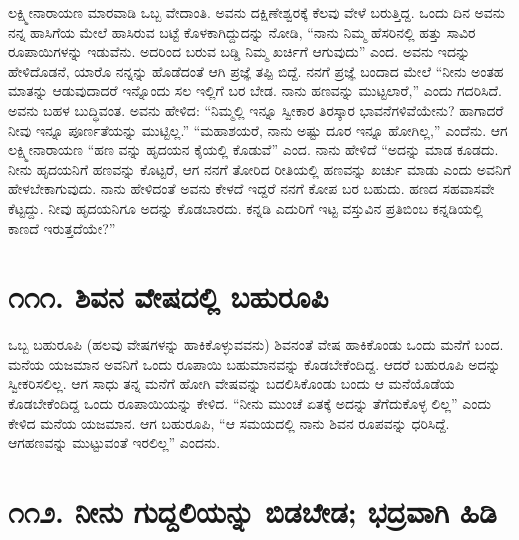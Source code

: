 ಲಕ್ಷ್ಮೀನಾರಾಯಣ ಮಾರವಾಡಿ ಒಬ್ಬ ವೇದಾಂತಿ. ಅವನು ದಕ್ಷಿಣೇಶ್ವರಕ್ಕೆ ಕೆಲವು ವೇಳೆ ಬರುತ್ತಿದ್ದ. ಒಂದು ದಿನ ಅವನು ನನ್ನ ಹಾಸಿಗೆಯ ಮೇಲೆ ಹಾಸಿರುವ ಬಟ್ಟೆ ಕೊಳಕಾಗಿದ್ದುದನ್ನು ನೋಡಿ, “ನಾನು ನಿಮ್ಮ ಹೆಸರಿನಲ್ಲಿ ಹತ್ತು ಸಾವಿರ ರೂಪಾಯಿಗಳನ್ನು ಇಡುವೆನು. ಅದರಿಂದ ಬರುವ ಬಡ್ಡಿ ನಿಮ್ಮ ಖರ್ಚಿಗೆ ಆಗುವುದು” ಎಂದ. ಅವನು ಇದನ್ನು ಹೇಳಿದೊಡನೆ, ಯಾರೊ ನನ್ನನ್ನು ಹೊಡೆದಂತೆ ಆಗಿ ಪ್ರಜ್ಞೆ ತಪ್ಪಿ ಬಿದ್ದೆ. ನನಗೆ ಪ್ರಜ್ಞೆ ಬಂದಾದ ಮೇಲೆ “ನೀನು ಅಂತಹ ಮಾತನ್ನು ಆಡುವುದಾದರೆ ಇನ್ನೊಂದು ಸಲ ಇಲ್ಲಿಗೆ ಬರ ಬೇಡ. ನಾನು ಹಣವನ್ನು ಮುಟ್ಟಲಾರೆ,” ಎಂದು ಗದರಿಸಿದೆ. ಅವನು ಬಹಳ ಬುದ್ಧಿವಂತ. ಅವನು ಹೇಳಿದ: “ನಿಮ್ಮಲ್ಲಿ ಇನ್ನೂ ಸ್ವೀಕಾರ ತಿರಸ್ಕಾರ ಭಾವನೆಗಳಿವೆಯೇನು? ಹಾಗಾದರೆ ನೀವು ಇನ್ನೂ ಪೂರ್ಣತೆಯನ್ನು ಮುಟ್ಟಿಲ್ಲ.” “ಮಹಾಶಯರೆ, ನಾನು ಅಷ್ಟು ದೂರ ಇನ್ನೂ ಹೋಗಿಲ್ಲ,” ಎಂದೆನು. ಆಗ ಲಕ್ಷ್ಮೀನಾರಾಯಣ “ಹಣ ವನ್ನು ಹೃದಯನ ಕೈಯಲ್ಲಿ ಕೊಡುವೆ” ಎಂದ. ನಾನು ಹೇಳಿದೆ “ಅದನ್ನು ಮಾಡ ಕೂಡದು. ನೀನು ಹೃದಯನಿಗೆ ಹಣವನ್ನು ಕೊಟ್ಟರೆ, ಆಗ ನನಗೆ ತೋರಿದ ರೀತಿಯಲ್ಲಿ ಹಣವನ್ನು ಖರ್ಚು ಮಾಡು ಎಂದು ಅವನಿಗೆ ಹೇಳಬೇಕಾಗುವುದು. ನಾನು ಹೇಳಿದಂತೆ ಅವನು ಕೇಳದೆ ಇದ್ದರೆ ನನಗೆ ಕೋಪ ಬರ ಬಹುದು. ಹಣದ ಸಹವಾಸವೇ ಕೆಟ್ಟದ್ದು. ನೀವು ಹೃದಯನಿಗೂ ಅದನ್ನು ಕೊಡಬಾರದು. ಕನ್ನಡಿ ಎದುರಿಗೆ ಇಟ್ಟ ವಸ್ತುವಿನ ಪ್ರತಿಬಿಂಬ ಕನ್ನಡಿಯಲ್ಲಿ ಕಾಣದೆ ಇರುತ್ತದೆಯೇ?”



\section{\num{೧೧೧. } ಶಿವನ ವೇಷದಲ್ಲಿ ಬಹುರೂಪಿ}

ಒಬ್ಬ ಬಹುರೂಪಿ (ಹಲವು ವೇಷಗಳನ್ನು ಹಾಕಿಕೊಳ್ಳುವವನು) ಶಿವನಂತೆ ವೇಷ ಹಾಕಿಕೊಂಡು ಒಂದು ಮನೆಗೆ ಬಂದ. ಮನೆಯ ಯಜಮಾನ ಅವನಿಗೆ ಒಂದು ರೂಪಾಯಿ ಬಹುಮಾನವನ್ನು ಕೊಡಬೇಕೆಂದಿದ್ದ. ಆದರೆ ಬಹುರೂಪಿ ಅದನ್ನು ಸ್ವೀಕರಿಸಲಿಲ್ಲ. ಆಗ ಸಾಧು ತನ್ನ ಮನೆಗೆ ಹೋಗಿ ವೇಷವನ್ನು ಬದಲಿಸಿಕೊಂಡು ಬಂದು ಆ ಮನೆಯೊಡೆಯ ಕೊಡಬೇಕೆಂದಿದ್ದ ಒಂದು ರೂಪಾಯಿಯನ್ನು ಕೇಳಿದ. “ನೀನು ಮುಂಚೆ ಏತಕ್ಕೆ ಅದನ್ನು ತೆಗೆದುಕೊಳ್ಳ ಲಿಲ್ಲ” ಎಂದು ಕೇಳಿದ ಮನೆಯ ಯಜಮಾನ. ಆಗ ಬಹುರೂಪಿ, “ಆ ಸಮಯದಲ್ಲಿ ನಾನು ಶಿವನ ರೂಪವನ್ನು ಧರಿಸಿದ್ದೆ. ಆಗಹಣವನ್ನು ಮುಟ್ಟುವಂತೆ ಇರಲಿಲ್ಲ” ಎಂದನು.


\section{\num{೧೧೨. } ನೀನು ಗುದ್ದಲಿಯನ್ನು ಬಿಡಬೇಡ; ಭದ್ರವಾಗಿ ಹಿಡಿ}

